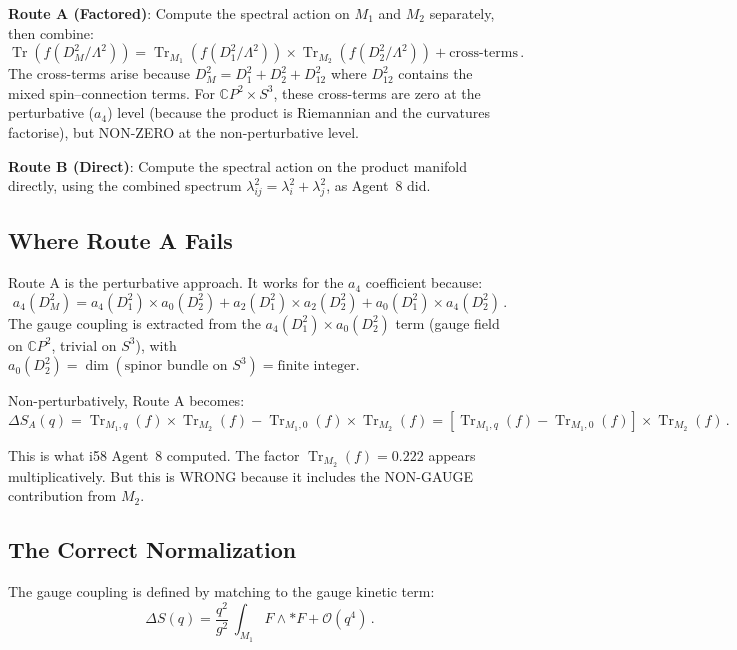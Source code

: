 \documentclass[11pt,a4paper]{article}
\newcommand{\Tr}{\operatorname{Tr}}
\newcommand{\CP}{\mathbb{C}P}
\begin{document}
\textbf{Route A (Factored)}: Compute the spectral action on $M_1$ and $M_2$ separately, then combine:
\begin{equation}
\Tr(f(D_M^2/\Lambda^2)) = \Tr_{M_1}(f(D_1^2/\Lambda^2)) \times \Tr_{M_2}(f(D_2^2/\Lambda^2)) + \text{cross-terms}\,.
\end{equation}
The cross-terms arise because $D_M^2 = D_1^2 + D_2^2 + D_{12}^2$ where $D_{12}^2$ contains the mixed spin--connection terms. For $\CP^2 \times S^3$, these cross-terms are zero at the perturbative ($a_4$) level (because the product is Riemannian and the curvatures factorise), but NON-ZERO at the non-perturbative level.

\textbf{Route B (Direct)}: Compute the spectral action on the product manifold directly, using the combined spectrum $\lambda_{ij}^2 = \lambda_i^2 + \lambda_j^2$, as Agent~8 did.

\subsection{Where Route A Fails}

Route A is the perturbative approach. It works for the $a_4$ coefficient because:
\begin{equation}
a_4(D_M^2) = a_4(D_1^2) \times a_0(D_2^2) + a_2(D_1^2) \times a_2(D_2^2) + a_0(D_1^2) \times a_4(D_2^2)\,.
\end{equation}
The gauge coupling is extracted from the $a_4(D_1^2) \times a_0(D_2^2)$ term (gauge field on $\CP^2$, trivial on $S^3$), with $a_0(D_2^2) = \dim(\text{spinor bundle on }S^3) = \text{finite integer}$.

Non-perturbatively, Route A becomes:
\begin{equation}
\label{eq:factored}
\Delta S_A(q) = \Tr_{M_1,q}(f) \times \Tr_{M_2}(f) - \Tr_{M_1,0}(f) \times \Tr_{M_2}(f) = [\Tr_{M_1,q}(f) - \Tr_{M_1,0}(f)] \times \Tr_{M_2}(f)\,.
\end{equation}

This is what i58 Agent~8 computed. The factor $\Tr_{M_2}(f) = 0.222$ appears multiplicatively. But this is WRONG because it includes the NON-GAUGE contribution from $M_2$.

\subsection{The Correct Normalization}

The gauge coupling is defined by matching to the gauge kinetic term:
\begin{equation}
\Delta S(q) = \frac{q^2}{g^2}\,\int_{M_1} F \wedge *F + \mathcal{O}(q^4)\,.
\end{equation}
\end{document}
